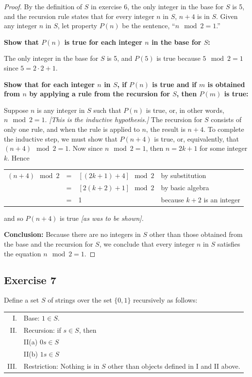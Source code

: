 \documentclass[14pt]{extarticle}
\newcommand{\cy}{\color{cyan}}
\begin{document}
\begin{proof}
By the definition of $S$ in exercise 6, the only integer in the base for $S$ is 5, and the recursion rule states that 
for every integer $n$ in $S$, \(n + 4\) is in $S$. Given any integer $n$ in $S$, let property $P(n)$ be the 
sentence, “\(n \mod 2 = 1\).”

{\bf Show that $P(n)$ is true for each integer $n$ in the base for $S$:}

The only integer in the base for $S$ is 5, and $P(5)$ is true because \(5 \mod 2 = 1\) since \(5 = 2 \cdot 2 + 1\). 

{\bf Show that for each integer $n$ in $S$, if $P(n)$ is true and if $m$ is obtained from $n$ by applying a rule 
from the recursion for $S$, then $P(m)$ is true:}

Suppose $n$ is any integer in $S$ such that $P(n)$ is true, or, in other words, \(n \mod 2 = 1\). {\it [This is the 
inductive hypothesis.]} The recursion for $S$ consists of only one rule, and when the rule is applied to $n$, the 
result is \(n + 4\). To complete the inductive step, we must show that \(P(n + 4)\) is true, or, equivalently, that 
\((n + 4) \mod 2 = 1\). Now since \(n \mod 2 = 1\), then \(n = 2k + 1\) for some integer $k$. Hence
\begin{center}
\begin{tabular}{rcll}
\((n + 4) \mod 2\) & = & \([(2k + 1) + 4] \mod 2\) & {\cy by substitution} \\
& = & \([2(k + 2) + 1] \mod 2\) & {\cy by basic algebra} \\
& = & 1 & {\cy because $k + 2$ is an integer} 
\end{tabular}
\end{center}
and so $P(n + 4)$ is true {\it [as was to be shown].}

{\bf Conclusion:} Because there are no integers in $S$ other than those obtained from the base and the recursion 
for $S$, we conclude that every integer $n$ in $S$ satisfies the equation \(n \mod 2 = 1\).
\end{proof}

\subsection{Exercise 7}
Define a set $S$ of strings over the set \(\{0, 1\}\) recursively as follows:

\begin{tabular}{rl}
I. & Base: $1 \in S$. \\
II. & Recursion: if $s \in S$, then \\
    & II(a) $0s \in S$ \\
    & II(b) $1s \in S$ \\
III. & Restriction: Nothing is in $S$ other than objects defined in I and II above.
\end{tabular}
\end{document}
